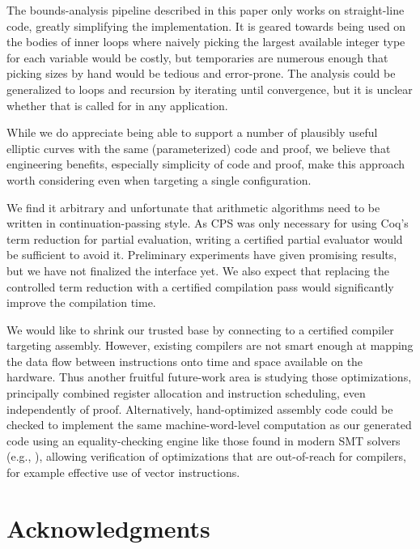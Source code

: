 \documentclass[conference,letterpaper]{IEEEtran}
\newcommand{\todo}[1]{\textcolor{red}{\textbf{TODO: #1}}}
\begin{document}
The bounds-analysis pipeline described in this paper only works on straight-line code, greatly simplifying the implementation.
It is geared towards being used on the bodies of inner loops where naively picking the largest available integer type for each variable would be costly, but temporaries are numerous enough that picking sizes by hand would be tedious and error-prone.
The analysis could be generalized to loops and recursion by iterating until convergence, but it is unclear whether that is called for in any application.

While we do appreciate being able to support a number of plausibly useful elliptic curves with the same (parameterized) code and proof,
we believe that engineering benefits, especially simplicity of code and proof, make this approach worth considering even when targeting a single configuration.

We find it arbitrary and unfortunate that arithmetic algorithms need to be written in continuation-passing style.
As CPS was only necessary for using Coq's term reduction for partial evaluation, writing a certified partial evaluator would be sufficient to avoid it.
Preliminary experiments have given promising results, but we have not finalized the interface yet.
We also expect that replacing the controlled term reduction with a certified compilation pass would significantly improve the compilation time.

We would like to shrink our trusted base by connecting to a certified compiler targeting assembly.
However, existing compilers are not smart enough at mapping the data flow between instructions onto time and space available on the hardware.
Thus another fruitful future-work area is studying those optimizations, principally combined register allocation and instruction scheduling, even independently of proof.
Alternatively, hand-optimized assembly code could be checked to implement the same machine-word-level computation as our generated code using an equality-checking engine like those found in modern SMT solvers (e.g., \cite{simplify}), allowing verification of optimizations that are out-of-reach for compilers, for example effective use of vector instructions.


\section*{Acknowledgments}
\end{document}
